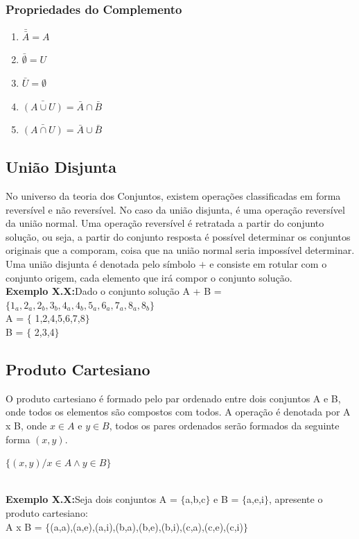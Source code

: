 \documentclass[a4paper,12pt,twoside,BCOR=10mm]{scrbook}
\begin{document}
\begin{titlepage}
\subsubsection{Propriedades do Complemento}
\begin{enumerate}
\item $\bar{\bar{A}} = A$
\item $\bar{\emptyset} = U$
\item $\bar{U} = \emptyset$
\item $\bar{(A \cup U)} = \bar{A} \cap \bar{B}$
\item $\bar{(A \cap U)} = \bar{A} \cup \bar{B}$
\end{enumerate}
\subsection{União Disjunta}
No universo da teoria dos Conjuntos, existem operações classificadas em forma reversível e não reversível. No caso da união disjunta, é uma operação reversível da união normal. Uma operação reversível é retratada a partir do conjunto solução, ou seja, a partir do conjunto resposta é possível determinar os conjuntos originais que a comporam, coisa que na união normal seria impossível determinar. Uma união disjunta é denotada pelo símbolo $+$ e consiste em rotular com o conjunto origem, cada elemento que irá compor o conjunto solução.
 \\
\textbf{Exemplo X.X:}Dado o conjunto solução A + B = $\{1_{a},2_{a},2_{b},3_{b},4_{a},4_{b},5_{a},6_{a},7_{a},8_{a}, 8_{b}\}$\\
A = $\{$ 1,2,4,5,6,7,8$\}$\\
B = $\{$ 2,3,4$\}$
\\
\subsection{Produto Cartesiano}
O produto cartesiano é formado pelo par ordenado entre dois conjuntos A e B, onde todos os elementos são compostos com todos. A operação é denotada por A x B, onde $x \in A$ e $y \in B$, todos os pares ordenados serão formados da seguinte forma $(x,y)$.

\begin{center}
$\{(x,y) / x \in A \wedge y \in B \}$
\end{center}
 \\
\textbf{Exemplo X.X:}Seja dois conjuntos A = $\{$a,b,c$\}$ e B = $\{$a,e,i$\}$, apresente o produto cartesiano:\\
A x B = $\{$(a,a),(a,e),(a,i),(b,a),(b,e),(b,i),(c,a),(c,e),(c,i)$\}$\\


\end{titlepage}
\end{document}
